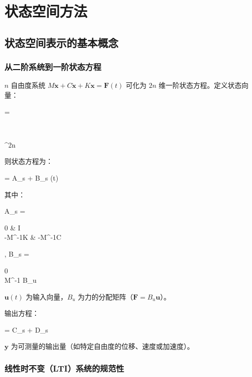 \chapter{状态空间方法}


\section{状态空间表示的基本概念}

\subsection{从二阶系统到一阶状态方程}

$n$ 自由度系统 $M\ddot{\mathbf{x}} + C\dot{\mathbf{x}} + K\mathbf{x} = \mathbf{F}(t)$ 可化为 $2n$ 维一阶状态方程。定义状态向量：
\begin{myformula}
	 = \begin{pmatrix}  \\  \end{pmatrix} \in {}^{2n}
\end{myformula}

则状态方程为：
\begin{myformula}
	 = A_s  + B_s (t)
\end{myformula}
其中：
\begin{myformula}
	A_s = \begin{pmatrix} 0 & I \\ -M^{-1}K & -M^{-1}C \end{pmatrix}, \quad
	B_s = \begin{pmatrix} 0 \\ M^{-1} B_u \end{pmatrix}
\end{myformula}
$\mathbf{u}(t)$ 为输入向量，$B_u$ 为力的分配矩阵（$\mathbf{F} = B_u \mathbf{u}$）。

输出方程：
\begin{myformula}
	 = C_s  + D_s 
\end{myformula}
$\mathbf{y}$ 为可测量的输出量（如特定自由度的位移、速度或加速度）。

\subsection{线性时不变（LTI）系统的规范性}


